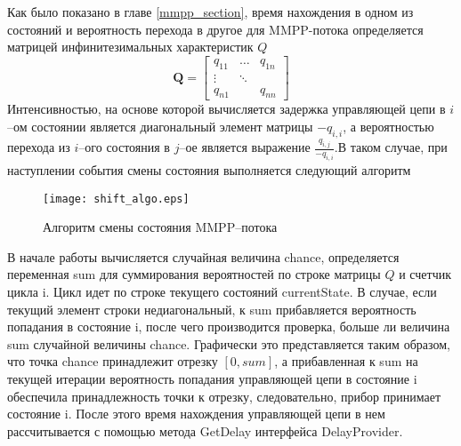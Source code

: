 Как было показано в главе \ref{mmpp_section}, время нахождения в одном из состояний и вероятность перехода в другое для MMPP-потока определяется матрицей инфинитезимальных характеристик $Q$
\begin{equation*}
	\boldsymbol{Q}=\begin{bmatrix}
		q_{11} &  \dots &  q_{1n}\\
		\vdots & \ddots &  \\
		q_{n1} &    	&	q_{nn}
	\end{bmatrix}
\end{equation*}
Интенсивностью, на основе которой вычисляется задержка управляющей цепи в $i$--ом состоянии является диагональный элемент матрицы $-q_{i,i}$, а вероятностью перехода из $i$--ого состояния в $j$--ое является выражение $\frac{q_{i,j}}{-q_{i,i}}$.В таком случае, при наступлении события смены состояния выполняется следующий алгоритм
   \begin{figure}[H]
  	\centering
  	\texttt{[image: shift\_algo.eps]}
  	\caption{Алгоритм смены состояния MMPP--потока}
  	\label{shift_algo_uml}
  \end{figure}
В начале работы вычисляется случайная величина chance, определяется переменная sum для суммирования вероятностей по строке матрицы $Q$ и счетчик цикла i. Цикл идет по строке текущего состояний currentState. В случае, если текущий элемент строки недиагональный, к sum прибавляется вероятность попадания в состояние i, после чего производится проверка, больше ли величина sum случайной величины chance. Графически это представляется таким образом, что точка chance принадлежит отрезку $[0,sum]$, а прибавленная к sum на текущей итерации вероятность попадания управляющей цепи в состояние i обеспечила принадлежность точки к отрезку, следовательно, прибор принимает состояние i. После этого время нахождения управляющей цепи в нем рассчитывается с помощью метода GetDelay интерфейса DelayProvider.
\clearpage

